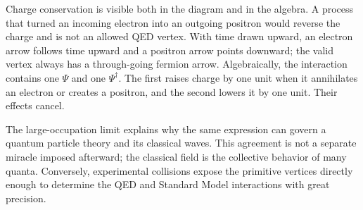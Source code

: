 \begin{classroomqa}
\end{classroomqa}

Charge conservation is visible both in the diagram and in the algebra. A process that turned an incoming electron into an outgoing positron would reverse the charge and is not an allowed QED vertex. With time drawn upward, an electron arrow follows time upward and a positron arrow points downward; the valid vertex always has a through-going fermion arrow. Algebraically, the interaction contains one \(\Psi\) and one \(\Psi^\dagger\). The first raises charge by one unit when it annihilates an electron or creates a positron, and the second lowers it by one unit. Their effects cancel.

\begin{classroomqa}
\end{classroomqa}

\begin{classroomqa}
\end{classroomqa}

The large-occupation limit explains why the same expression can govern a quantum particle theory and its classical waves. This agreement is not a separate miracle imposed afterward; the classical field is the collective behavior of many quanta. Conversely, experimental collisions expose the primitive vertices directly enough to determine the QED and Standard Model interactions with great precision.

